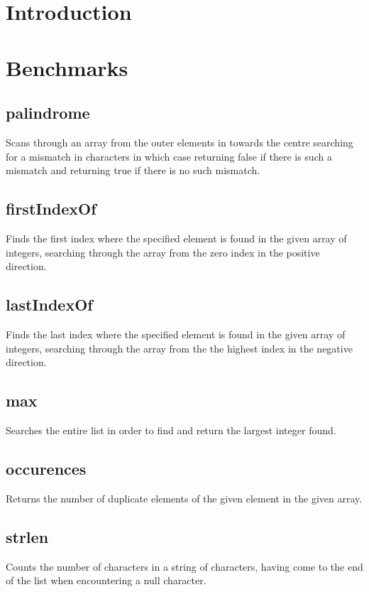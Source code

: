 \documentclass[10pt]{article} %
\begin{document}
\section{Introduction}

\section{Benchmarks}

\subsection{palindrome} 
Scans through an array from the outer elements in towards the centre searching for a mismatch in characters in which case returning false if there is such a mismatch and returning true if there is no such mismatch.

\subsection{firstIndexOf}
Finds the first index where the specified element is found in the given array of integers, searching through the array from the zero index in the positive direction.

\subsection{lastIndexOf}
Finds the last index where the specified element is found in the given array of integers, searching through the array from the the highest index in the negative direction.

\subsection{max}
Searches the entire list in order to find and return the largest integer found.

\subsection{occurences}
Returns the number of duplicate elements of the given element in the given array.

\subsection{strlen}
Counts the number of characters in a string of characters, having come to the end of the list when encountering a null character.

\end{document}
